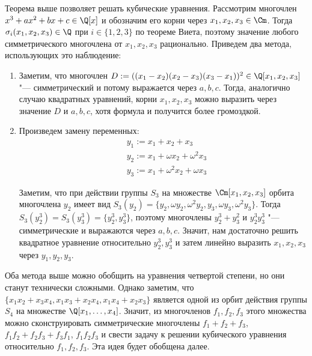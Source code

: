 \begin{example}
	Теорема выше позволяет решать кубические уравнения. Рассмотрим многочлен $x^3 + ax^2 + bx + c \in \Q[x]$ и обозначим его корни через $x_1, x_2, x_3 \in \Cm$. Тогда $\sigma_i(x_1, x_2, x_3) \in \Q$ при $i \in \{1, 2, 3\}$ по теореме Виета, поэтому значение любого симметрического многочлена от $x_1, x_2, x_3$ рационально. Приведем два метода, использующих это наблюдение:
	\begin{enumerate}
		\item Заметим, что многочлен $D := ((x_1 - x_2)(x_2 - x_3)(x_3 - x_1))^2 \in \Q[x_1, x_2, x_3]$ "--- симметрический и потому выражается через $a, b, c$. Тогда, аналогично случаю квадратных уравнений, корни $x_1, x_2, x_3$ можно выразить через значение $D$ и $a, b, c$, хотя формула и получится более громоздкой.
		\item Произведем замену переменных:
		\begin{align*}
			&y_1 := x_1 + x_2 + x_3\\
			&y_2 := x_1 + \omega x_2 + \omega^2 x_3\\
			&y_3 := x_1 + \omega^2 x_2 + \omega x_3
		\end{align*}
	
		Заметим, что при действии группы $S_3$ на множестве $\Cm[x_1, x_2, x_3]$ орбита многочлена $y_2$ имеет вид $S_3(y_2) = \{y_2, \omega y_2, \omega^2 y_2, y_3, \omega y_3, \omega^2 y_3\}$. Тогда $S_3(y_2^3) = S_3(y_3^3) = \{y_2^3, y_3^3\}$, поэтому многочлены $y_2^3 + y_3^2$ и $y_2^3y_3^3$ "--- симметрические и выражаются через $a, b, c$. Значит, нам достаточно решить квадратное уравнение относительно $y_2^3, y_3^3$ и затем линейно выразить $x_1, x_2, x_3$ через $y_1, y_2, y_3$.
	\end{enumerate}
\end{example}

\begin{note}
	Оба метода выше можно обобщить на уравнения четвертой степени, но они станут технически сложными. Однако заметим, что $\{x_1x_2 + x_3x_4, x_1x_3 + x_2x_4, x_1x_4 + x_2x_3\}$ является одной из орбит действия группы $S_4$ на множестве $\Q[x_1, \dotsc, x_4]$. Значит, из многочленов $f_1, f_2, f_3$ этого множества можно сконструировать симметрические многочлены $f_1 + f_2 + f_3$, $f_1f_2 + f_2f_3 + f_3f_1$, $f_1f_2f_3$ и свести задачу к решении кубического уравнения относительно $f_1, f_2, f_3$. Эта идея будет обобщена далее.
\end{note}